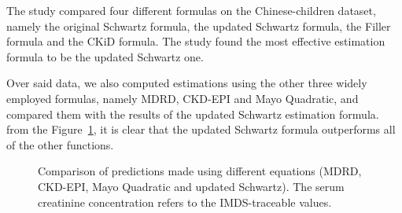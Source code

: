 \documentclass[10pt,final]{siamltex}
\begin{document}
The study \cite{gfr} compared four different formulas on the Chinese-children dataset, namely the original Schwartz formula, the updated Schwartz formula, the Filler formula and the CKiD formula. The study found the most effective estimation formula to be the updated Schwartz one.

Over said data, we also computed estimations using the other three widely employed formulas, namely MDRD, CKD-EPI and Mayo Quadratic, and compared them with the results of the updated Schwartz estimation formula.
from the Figure~\ref{equations}, it is clear that the updated Schwartz formula outperforms all of the other functions.
%
\begin{figure}[ht]
  \centering
  \caption{Comparison of predictions made using different equations (MDRD, CKD-EPI, Mayo Quadratic and updated Schwartz). The serum creatinine concentration refers to the IMDS-traceable values.}
  \label{equations}
\end{figure}
\end{document}
